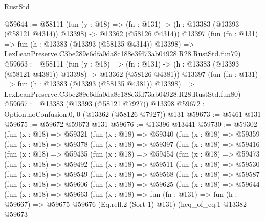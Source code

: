 \begin{lexlean}{RustStd}
\begin{coremodule}
@59644 := @58111
    (fun (y : @18) =>
    (fn : @131) -> (h : @13383 (@13393 (@58121 @4314)) @13398) -> @13362 (@58126 @4314))
    @13397
    (fun (fn : @131) =>
    fun (h : @13383 (@13393 (@58135 @4314)) @13398) =>
    LexLeanPreserve.C3be289e6dfa0da8c188e3fd73ab04928.R28.RustStd.fun79)
@59663 := @58111
    (fun (y : @18) =>
    (fn : @131) -> (h : @13383 (@13393 (@58121 @4381)) @13398) -> @13362 (@58126 @4381))
    @13397
    (fun (fn : @131) =>
    fun (h : @13383 (@13393 (@58135 @4381)) @13398) =>
    LexLeanPreserve.C3be289e6dfa0da8c188e3fd73ab04928.R28.RustStd.fun80)
@59667 := @13383 (@13393 (@58121 @7927)) @13398
@59672 := Option.noConfusion.{0, 0} (@13362 (@58126 @7927)) @131
@59673 := @5461 @131
@59675 := @59672 @59673 @131
@59676 := @13396 @13441
@59730 := @59302
    (fun (x : @18) =>
    @59321
      (fun (x : @18) =>
      @59340
        (fun (x : @18) =>
        @59359
          (fun (x : @18) =>
          @59378
            (fun (x : @18) =>
            @59397
              (fun (x : @18) =>
              @59416
                (fun (x : @18) =>
                @59435
                  (fun (x : @18) =>
                  @59454
                    (fun (x : @18) =>
                    @59473
                      (fun (x : @18) =>
                      @59492
                        (fun (x : @18) =>
                        @59511
                          (fun (x : @18) =>
                          @59530
                            (fun (x : @18) =>
                            @59549
                              (fun (x : @18) =>
                              @59568
                                (fun (x : @18) =>
                                @59587
                                  (fun (x : @18) =>
                                  @59606
                                    (fun (x : @18) =>
                                    @59625
                                      (fun (x : @18) =>
                                      @59644
                                        (fun (x : @18) =>
                                        @59663
                                          (fun (x : @18) =>
                                          fun (fn : @131) =>
                                          fun (h : @59667) =>
                                          @59675
                                            @59676
                                            (Eq.refl.{2} (Sort 1) @131)
                                            (heq_of_eq.{1}
                                              @13382
                                              @59673

\end{coremodule}
\end{lexlean}
